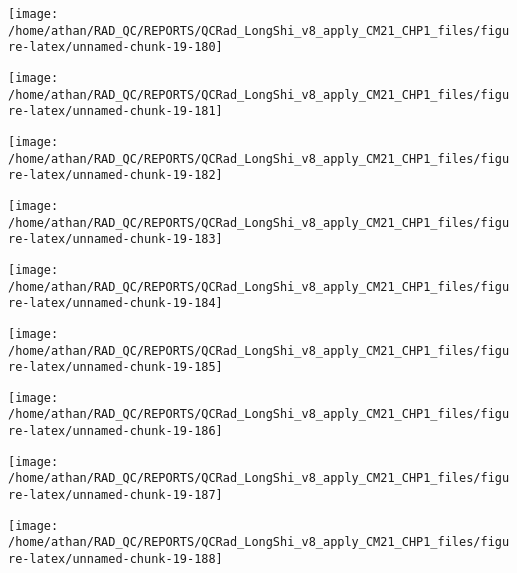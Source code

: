 \documentclass[
  10pt,
  a4paper,oneside]{article}
\begin{document}
\begin{center}\texttt{[image: /home/athan/RAD\_QC/REPORTS/QCRad\_LongShi\_v8\_apply\_CM21\_CHP1\_files/figure-latex/unnamed-chunk-19-180]} \end{center}

\begin{center}\texttt{[image: /home/athan/RAD\_QC/REPORTS/QCRad\_LongShi\_v8\_apply\_CM21\_CHP1\_files/figure-latex/unnamed-chunk-19-181]} \end{center}

\begin{center}\texttt{[image: /home/athan/RAD\_QC/REPORTS/QCRad\_LongShi\_v8\_apply\_CM21\_CHP1\_files/figure-latex/unnamed-chunk-19-182]} \end{center}

\begin{center}\texttt{[image: /home/athan/RAD\_QC/REPORTS/QCRad\_LongShi\_v8\_apply\_CM21\_CHP1\_files/figure-latex/unnamed-chunk-19-183]} \end{center}

\begin{center}\texttt{[image: /home/athan/RAD\_QC/REPORTS/QCRad\_LongShi\_v8\_apply\_CM21\_CHP1\_files/figure-latex/unnamed-chunk-19-184]} \end{center}

\begin{center}\texttt{[image: /home/athan/RAD\_QC/REPORTS/QCRad\_LongShi\_v8\_apply\_CM21\_CHP1\_files/figure-latex/unnamed-chunk-19-185]} \end{center}

\begin{center}\texttt{[image: /home/athan/RAD\_QC/REPORTS/QCRad\_LongShi\_v8\_apply\_CM21\_CHP1\_files/figure-latex/unnamed-chunk-19-186]} \end{center}

\begin{center}\texttt{[image: /home/athan/RAD\_QC/REPORTS/QCRad\_LongShi\_v8\_apply\_CM21\_CHP1\_files/figure-latex/unnamed-chunk-19-187]} \end{center}

\begin{center}\texttt{[image: /home/athan/RAD\_QC/REPORTS/QCRad\_LongShi\_v8\_apply\_CM21\_CHP1\_files/figure-latex/unnamed-chunk-19-188]} \end{center}
\end{document}

